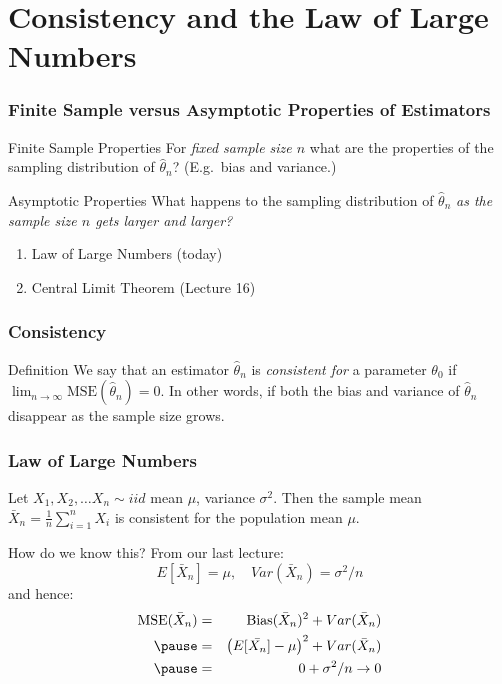 \section{Consistency and the Law of Large Numbers}
\begin{frame}
\frametitle{Finite Sample versus Asymptotic Properties of Estimators}

\begin{block}{Finite Sample Properties}
For \emph{fixed sample size $n$} what are the properties of the sampling distribution of $\widehat{\theta}_n$? (E.g.\ bias and variance.)
\end{block}

\begin{block}{Asymptotic Properties}
What happens to the sampling distribution of $\widehat{\theta}_n$ \alert{\emph{as the sample size $n$ gets larger and larger?}} 
  \begin{enumerate}
    \item Law of Large Numbers (today)
    \item Central Limit Theorem (Lecture 16)
  \end{enumerate}
\end{block}

\end{frame}
\begin{frame}
\frametitle{Consistency}

\begin{block}{Definition}
  We say that an estimator $\widehat{\theta}_n$ is \emph{consistent for} a parameter $\theta_0$ if $\lim_{n\rightarrow \infty} \text{MSE}(\widehat{\theta}_n) = 0$.
  In other words, if both the bias and variance of $\widehat{\theta}_n$ disappear as the sample size grows.
\end{block}

\end{frame}

\begin{frame}
  \frametitle{Law of Large Numbers}

Let $X_1, X_2, \hdots X_n \sim iid$ mean $\mu$, variance $\sigma^2$. Then the sample mean $\bar{X}_n = \frac{1}{n}\sum_{i=1}^n X_i$
is consistent for the population mean $\mu$.

\pause

\vspace{1em}

\begin{block}{How do we know this?}
From our last lecture:
\[
  E[\bar{X}_n] = \mu, \quad Var(\bar{X}_n) = \sigma^2/n
  \]
and hence:
\begin{eqnarray*}
			\mbox{MSE}(\bar{X}_n) &=& \mbox{Bias}(\bar{X}_n)^2 + Var(\bar{X}_n)\\\pause
				&=& \left(E[\bar{X_n}] - \mu\right)^2 + Var(\bar{X}_n)\\ \pause
				&=& 0 + \sigma^2/n \rightarrow 0  
	\end{eqnarray*}
\end{block}

\end{frame}

